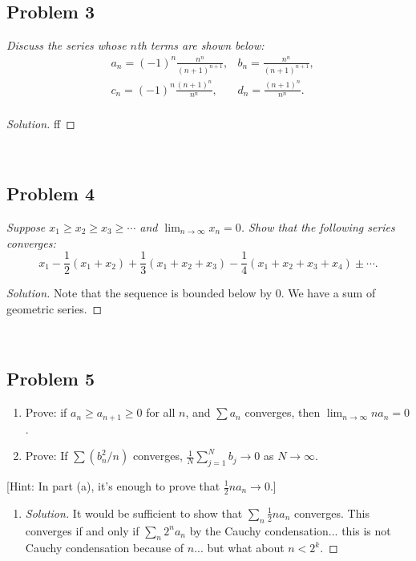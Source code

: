\documentclass{article}
\begin{document}
\subsection*{Problem 3}
{\it Discuss the series whose $n$th terms are shown below:
\begin{align*}
	&a_n = (-1)^n\frac{n^n}{(n+1)^{n+1}},
	&b_n = \frac{n^n}{(n+1)^{n+1}},\\
	&c_n = (-1)^n\frac{(n+1)^n}{n^n},
	&d_n = \frac{(n+1)^n}{n^n}.\\
\end{align*}

\begin{proof}[Solution]\let\qed\relax
	ff
\end{proof}
\clearpage
~\clearpage

\subsection*{Problem 4}
{\it Suppose $x_1 \geq x_2 \geq x_3 \geq \cdots$ and $\lim_{n \to \infty}x_n = 0$.
Show that the following series converges:
\[
	x_1 - \frac{1}{2}(x_1 + x_2) + \frac{1}{3}(x_1 + x_2 + x_3)
	- \frac{1}{4}(x_1 + x_2 + x_3 + x_4) \pm \cdots.
\]}
\begin{proof}[Solution]\let\qed\relax
	Note that the sequence is bounded below by $0$.
	We have a sum of geometric series.
\end{proof}
\clearpage
~\clearpage

\subsection*{Problem 5}
{\it \begin{enumerate}
	\item Prove: if $a_n \geq a_{n+1} \geq 0$ for all $n$,
	and $\sum a_n$ converges, then $\lim_{n\to\infty}na_n = 0$.
	\item Prove: If $\sum(b_n^2/n)$ converges,
	$\frac{1}{N}\sum_{j=1}^N b_j \to 0$ as $N \to \infty$.
\end{enumerate}
[Hint: In part (a), it's enough to prove that $\frac12 na_n \to 0$.]

\begin{enumerate}
	\item \begin{proof}[Solution]\let\qed\relax
		It would be sufficient to show that $\sum_n \frac{1}{2}n a_n$ converges.
		This converges if and only if $\sum_n 2^n a_n$
		by the Cauchy condensation... this is not Cauchy condensation
		because of $n$... but what about $n < 2^k$.


\end{proof}
\end{enumerate}}}
\end{document}
